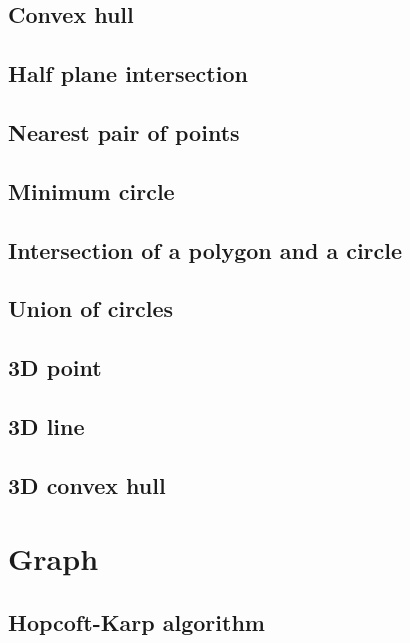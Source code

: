 \documentclass[titlepage, a4paper,10pt]{article}
\begin{document}
\begin{multicols}{2}
\begin{spacing}{0.6}
{			\subsection{Convex hull}
				
			\subsection{Half plane intersection}
				
			\subsection{Nearest pair of points}
				
			\subsection{Minimum circle}
				
			\subsection{Intersection of a polygon and a circle}
				
			\subsection{Union of circles}
				
			\subsection{3D point}
				
			\subsection{3D line}
				
			\subsection{3D convex hull}
				
		\section{Graph}
				
			\subsection{Hopcoft-Karp algorithm}
				
}
\end{spacing}
\end{multicols}
\end{document}
